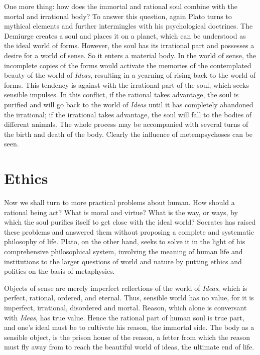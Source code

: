 \documentclass[11pt]{article}
\begin{document}
\begin{sloppypar}
One more thing: 
how does the immortal and rational soul combine with the mortal and irrational body? 
To answer this question, again Plato turns to mythical elements and further intermingles with his psychological doctrines. 
The Demiurge creates a soul and places it on a planet, which can be understood as the ideal world of forms. 
However, the soul has its irrational part and possesses a desire for a world of sense. 
So it enters a material body. 
In the world of sense, the incomplete copies of the forms would activate the memories of the contemplated beauty of the world of \textit{Ideas}, resulting in a yearning of rising back to the world of forms. 
This tendency is against with the irrational part of the soul, which seeks sensible impulses. 
In this conflict, if the rational takes advantage, the soul is purified and will go back to the world of \textit{Ideas} until it has completely abandoned the irrational; 
if the irrational takes advantage, the soul will fall to the bodies of different animals. 
The whole process may be accompanied with several turns of the birth and death of the body. 
Clearly the influence of metempsychoses can be seen.
  
\section{Ethics}
Now we shall turn to more practical problems about human. 
How should a rational being act? 
What is moral and virtue? 
What is the way, or ways, by which the soul purifies itself to get close with the ideal world? 
Socrates has raised these problems and answered them without proposing a complete and systematic philosophy of life. 
Plato, on the other hand, seeks to solve it in the light of his comprehensive philosophical system, involving the meaning of human life and institutions to the larger questions of world and nature by putting ethics and politics on the basis of metaphysics.

\newline

Objects of sense are merely imperfect reflections of the world of \textit{Ideas}, which is perfect, rational, ordered, and eternal. 
Thus, sensible world has no value, for it is imperfect, irrational, disordered and mortal. 
Reason, which alone is conversant with \textit{Ideas}, has true value. 
Hence the rational part of human soul is true part, and one’s ideal must be to cultivate his reason, the immortal side. 
The body as a sensible object, is the prison house of the reason, a fetter from which the reason must fly away from to reach the beautiful world of ideas, the ultimate end of life.


\end{sloppypar}
\end{document}
